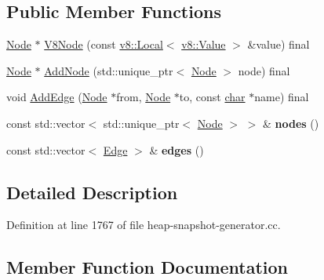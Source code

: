 \subsection*{Public Member Functions}
\begin{DoxyCompactItemize}
\item 
\mbox{\hyperlink{classv8_1_1EmbedderGraph_1_1Node}{Node}} $\ast$ \mbox{\hyperlink{classv8_1_1internal_1_1EmbedderGraphImpl_aa205df27c645b256ba9f5e8bbbb08497}{V8\+Node}} (const \mbox{\hyperlink{classv8_1_1Local}{v8\+::\+Local}}$<$ \mbox{\hyperlink{classv8_1_1Value}{v8\+::\+Value}} $>$ \&value) final
\item 
\mbox{\hyperlink{classv8_1_1EmbedderGraph_1_1Node}{Node}} $\ast$ \mbox{\hyperlink{classv8_1_1internal_1_1EmbedderGraphImpl_a13ad2b317c1c89b9647af9ec9f006c7f}{Add\+Node}} (std\+::unique\+\_\+ptr$<$ \mbox{\hyperlink{classv8_1_1EmbedderGraph_1_1Node}{Node}} $>$ node) final
\item 
void \mbox{\hyperlink{classv8_1_1internal_1_1EmbedderGraphImpl_ab15bea64bca0bb2185d9cf046f0547d8}{Add\+Edge}} (\mbox{\hyperlink{classv8_1_1EmbedderGraph_1_1Node}{Node}} $\ast$from, \mbox{\hyperlink{classv8_1_1EmbedderGraph_1_1Node}{Node}} $\ast$to, const \mbox{\hyperlink{classchar}{char}} $\ast$name) final
\item 
\mbox{\label{classv8_1_1internal_1_1EmbedderGraphImpl_af571a48ebd332368663e187c831e222c}} 
const std\+::vector$<$ std\+::unique\+\_\+ptr$<$ \mbox{\hyperlink{classv8_1_1EmbedderGraph_1_1Node}{Node}} $>$ $>$ \& {\bfseries nodes} ()
\item 
\mbox{\label{classv8_1_1internal_1_1EmbedderGraphImpl_ac675b32271afa17ed40339fdd6cfbfe8}} 
const std\+::vector$<$ \mbox{\hyperlink{structv8_1_1internal_1_1EmbedderGraphImpl_1_1Edge}{Edge}} $>$ \& {\bfseries edges} ()
\end{DoxyCompactItemize}


\subsection{Detailed Description}


Definition at line 1767 of file heap-\/snapshot-\/generator.\+cc.



\subsection{Member Function Documentation}
\mbox{\label{classv8_1_1internal_1_1EmbedderGraphImpl_ab15bea64bca0bb2185d9cf046f0547d8}} 
